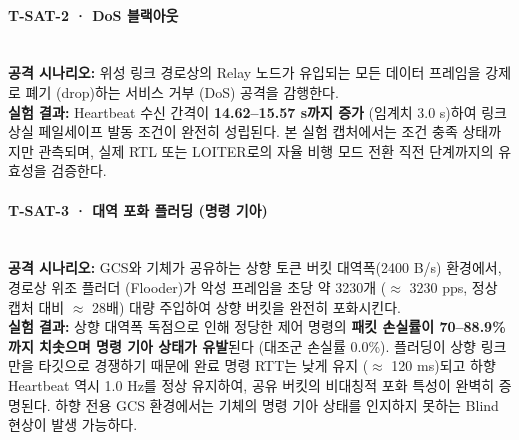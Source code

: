 
\paragraph{\textbf{T-SAT-2 · DoS 블랙아웃}} ~\\
\textbf{공격 시나리오:} 위성 링크 경로상의 Relay 노드가 유입되는 모든 데이터 프레임을 강제로 폐기 (drop)하는 서비스 거부 (DoS) 공격을 감행한다.\\
\textbf{실험 결과:} Heartbeat 수신 간격이 \textbf{14.62--15.57 s까지 증가} (임계치 3.0 s)하여 링크 상실 페일세이프 발동 조건이 완전히 성립된다. 본 실험 캡처에서는 조건 충족 상태까지만 관측되며, 실제 RTL 또는 LOITER로의 자율 비행 모드 전환 직전 단계까지의 유효성을 검증한다.


\paragraph{\textbf{T-SAT-3 · 대역 포화 플러딩 (명령 기아)}} ~\\
\textbf{공격 시나리오:} GCS와 기체가 공유하는 상향 토큰 버킷 대역폭(2400 B/s) 환경에서, 경로상 위조 플러더 (Flooder)가 악성 프레임을 초당 약 3230개 ($\approx$ 3230 pps, 정상 캡처 대비 $\approx$ 28배) 대량 주입하여 상향 버킷을 완전히 포화시킨다.\\
\textbf{실험 결과:} 상향 대역폭 독점으로 인해 정당한 제어 명령의 \textbf{패킷 손실률이 70--88.9\%까지 치솟으며 명령 기아 상태가 유발}된다 (대조군 손실률 0.0\%). 플러딩이 상향 링크만을 타깃으로 경쟁하기 때문에 완료 명령 RTT는 낮게 유지 ($\approx$ 120 ms)되고 하향 Heartbeat 역시 1.0 Hz를 정상 유지하여, 공유 버킷의 비대칭적 포화 특성이 완벽히 증명된다. 하향 전용 GCS 환경에서는 기체의 명령 기아 상태를 인지하지 못하는 Blind 현상이 발생 가능하다.

